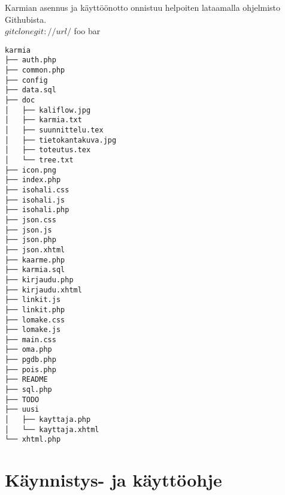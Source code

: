 \documentclass[11pt]{article}
\begin{document}
\begin{enumerate}
\list Karmian asennus ja käyttöönotto onnistuu helpoiten lataamalla ohjelmisto Githubista. \\ $ git clone git://url/ $
\list foo
\list bar
\end{enumerate}

\begin{verbatim}
karmia
├── auth.php
├── common.php
├── config
├── data.sql
├── doc
│   ├── kaliflow.jpg
│   ├── karmia.txt
│   ├── suunnittelu.tex
│   ├── tietokantakuva.jpg
│   ├── toteutus.tex
│   └── tree.txt
├── icon.png
├── index.php
├── isohali.css
├── isohali.js
├── isohali.php
├── json.css
├── json.js
├── json.php
├── json.xhtml
├── kaarme.php
├── karmia.sql
├── kirjaudu.php
├── kirjaudu.xhtml
├── linkit.js
├── linkit.php
├── lomake.css
├── lomake.js
├── main.css
├── oma.php
├── pgdb.php
├── pois.php
├── README
├── sql.php
├── TODO
├── uusi
│   ├── kayttaja.php
│   └── kayttaja.xhtml
└── xhtml.php
\end{verbatim}

\section{Käynnistys- ja käyttöohje}



\end{document}
